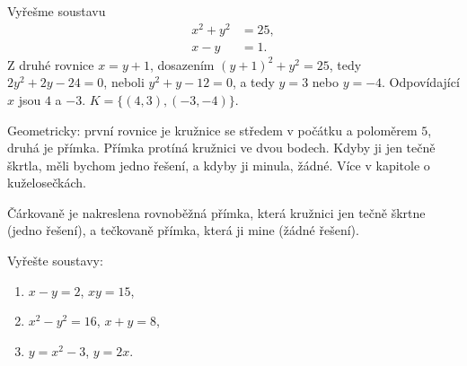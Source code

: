 \begin{example}
  Vyřešme soustavu
  \begin{align*}
    x^2 + y^2 &= 25,\\
    x - y &= 1.
  \end{align*}
  Z druhé rovnice $x = y + 1$, dosazením ${(y + 1)}^2 + y^2 = 25$, tedy $2y^2 + 2y - 24 = 0$, neboli $y^2 + y - 12 = 0$, a tedy $y = 3$ nebo $y = -4$. Odpovídající $x$ jsou $4$ a $-3$. $K = \{(4, 3), (-3, -4)\}$.

  Geometricky: první rovnice je kružnice se středem v počátku a poloměrem $5$, druhá je přímka. Přímka protíná kružnici ve dvou bodech. Kdyby ji jen tečně škrtla, měli bychom jedno řešení, a kdyby ji minula, žádné. Více v kapitole o kuželosečkách.
  \begin{center}
  \end{center}
  Čárkovaně je nakreslena rovnoběžná přímka, která kružnici jen tečně škrtne (jedno řešení), a tečkovaně přímka, která ji mine (žádné řešení).
\end{example}

\begin{problem}
  Vyřešte soustavy:
  \begin{enumerate}[label=(\alph*)]
    \item $x - y = 2$, $xy = 15$,
    \item $x^2 - y^2 = 16$, $x + y = 8$,
    \item $y = x^2 - 3$, $y = 2x$.
  \end{enumerate}
\end{problem}

